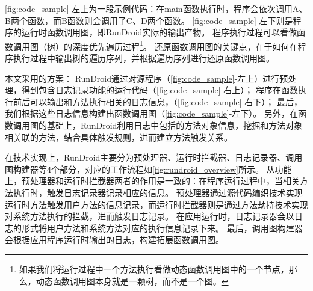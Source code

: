 \autoref{fig:code_sample}-左上为一段示例代码：在main函数执行时，程序会依次调用A、B两个函数，而B函数则会调用了C、D两个函数。
\autoref{fig:code_sample}-左下则是程序的运行时函数调用图，即RunDroid实际的输出产物。
程序执行过程可以看做函数调用图（树）的深度优先遍历过程\footnote{如果我们将运行过程中一个方法执行看做动态函数调用图中的一个节点，那么，动态函数调用图本身就是一颗树，而不是一个图。}。
还原函数调用图的关键点，在于如何在程序执行过程中输出树的遍历序列，并根据遍历序列进行还原函数调用图。

本文采用的方案：
RunDroid通过对源程序（\autoref{fig:code_sample}-左上）进行预处理，得到包含日志记录功能的运行代码（\autoref{fig:code_sample}-右上）；
程序在函数执行前后可以输出和方法执行相关的日志信息，（\autoref{fig:code_sample}-右下）；
最后，我们根据这些日志信息构建出函数调用图（\autoref{fig:code_sample}-左下）。
另外，在函数调用图的基础上，RunDroid利用日志中包括的方法对象信息，挖掘和方法对象相关联的方法，结合具体触发规则，进而建立方法触发关系。


在技术实现上，RunDroid主要分为预处理器、运行时拦截器、日志记录器、调用图构建器等4个部分，对应的工作流程如\autoref{fig:rundroid_overview}所示。
从功能上，预处理器和运行时拦截器两者的作用是一致的：在程序运行过程中，当相关方法执行时，触发日志记录器记录相应的信息。
预处理器通过源代码编织技术实现运行时方法触发用户方法的信息记录，而运行时拦截器则是通过方法劫持技术实现对系统方法执行的拦截，进而触发日志记录。
在应用运行时，日志记录器会以日志的形式将用户方法和系统方法对应的执行信息记录下来。
最后，调用图构建器会根据应用程序运行时输出的日志，构建拓展函数调用图。




